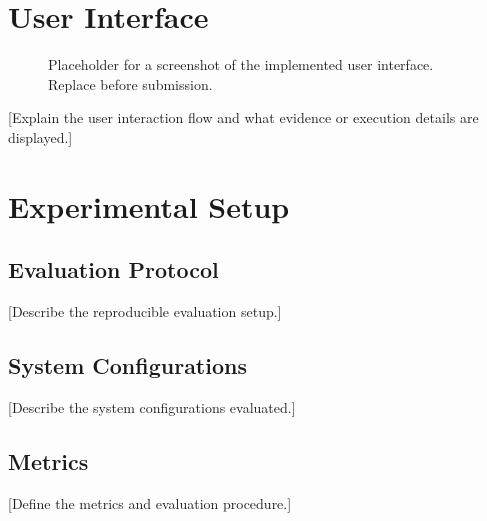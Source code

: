 \documentclass[sigconf]{acmart}
\begin{document}
\section{User Interface}
\begin{figure}[t]
  \centering
  \caption{Placeholder for a screenshot of the implemented user interface. Replace before submission.}
  \label{fig:ui}
\end{figure}
[Explain the user interaction flow and what evidence or execution details are displayed.]

\section{Experimental Setup}
\subsection{Evaluation Protocol}
[Describe the reproducible evaluation setup.]

\subsection{System Configurations}
[Describe the system configurations evaluated.]

\subsection{Metrics}
[Define the metrics and evaluation procedure.]
\end{document}
